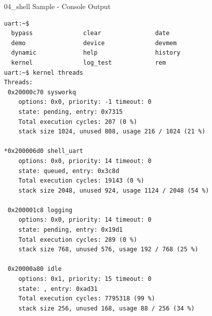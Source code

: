 \documentclass[10pt, aspectratio=169]{beamer}
\begin{document}
\begin{frame}[fragile]{04\_shell Sample - Console Output}
  \begin{listing}[H]
    \begin{verbatim}
uart:~$
  bypass              clear               date
  demo                device              devmem
  dynamic             help                history
  kernel              log_test            rem
uart:~$ kernel threads
Threads:
 0x20000c70 sysworkq
	options: 0x0, priority: -1 timeout: 0
	state: pending, entry: 0x7315
	Total execution cycles: 207 (0 %)
	stack size 1024, unused 808, usage 216 / 1024 (21 %)

*0x200006d0 shell_uart
	options: 0x0, priority: 14 timeout: 0
	state: queued, entry: 0x3c8d
	Total execution cycles: 19143 (0 %)
	stack size 2048, unused 924, usage 1124 / 2048 (54 %)

 0x200001c8 logging
	options: 0x0, priority: 14 timeout: 0
	state: pending, entry: 0x19d1
	Total execution cycles: 289 (0 %)
	stack size 768, unused 576, usage 192 / 768 (25 %)

 0x20000a80 idle
	options: 0x1, priority: 15 timeout: 0
	state: , entry: 0xad31
	Total execution cycles: 7795318 (99 %)
	stack size 256, unused 168, usage 88 / 256 (34 %)
    \end{verbatim}
  \end{listing}
\end{frame}
\end{document}
